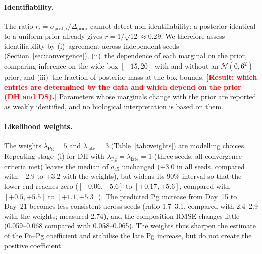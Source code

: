 \documentclass[11pt,a4paper]{article}
\newcommand{\TBD}[1]{\textcolor{red}{\textbf{[#1]}}}
\begin{document}
\paragraph{Identifiability.}
The ratio $r_i=\sigma_{\mathrm{post},i}/\Delta_{\mathrm{prior}}$ cannot detect non-identifiability: a posterior identical to a uniform prior already gives $r=1/\sqrt{12}\approx0.29$.
We therefore assess identifiability by (i)~agreement across independent seeds (Section~\ref{sec:convergence}), (ii)~the dependence of each marginal on the prior, comparing inference on the wide box $[-15,20]$ with and without an $\mathcal{N}(0,6^2)$ prior, and (iii)~the fraction of posterior mass at the box bounds.
\TBD{Result: which entries are determined by the data and which depend on the prior (DH and DS).}
Parameters whose marginals change with the prior are reported as weakly identified, and no biological interpretation is based on them.

\paragraph{Likelihood weights.}
The weights $\lambda_{\mathrm{Pg}}=5$ and $\lambda_{\mathrm{late}}=3$ (Table~\ref{tab:weights}) are modelling choices.
Repeating stage~(i) for DH with $\lambda_{\mathrm{Pg}}=\lambda_{\mathrm{late}}=1$ (three seeds, all convergence criteria met) leaves the median of $a_{45}$ unchanged ($+3.0$ in all seeds, compared with $+2.9$ to $+3.2$ with the weights), but widens its 90\% interval so that the lower end reaches zero ($[-0.06,+5.6]$ to $[+0.17,+5.6]$, compared with $[+0.5,+5.5]$ to $[+1.1,+5.3]$).
The predicted Pg increase from Day~15 to Day~21 becomes less consistent across seeds (ratio 1.7--3.1, compared with 2.4--2.9 with the weights; measured 2.74), and the composition RMSE changes little (0.059--0.068 compared with 0.058--0.065).
The weights thus sharpen the estimate of the Fn--Pg coefficient and stabilise the late Pg increase, but do not create the positive coefficient.
\end{document}
